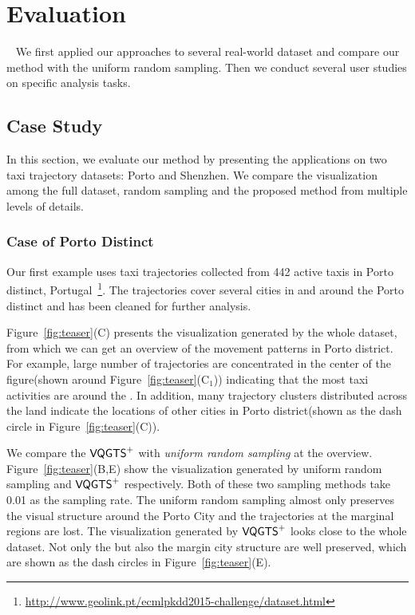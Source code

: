 \section{Evaluation}~\label{sec:exp}
We first applied our approaches to several real-world dataset and compare our method with the uniform random sampling. Then we conduct several user studies on specific analysis tasks. 
\subsection{Case Study}
In this section, we evaluate our method by presenting the applications on two taxi trajectory datasets: Porto and Shenzhen. We compare the visualization among the full dataset, random sampling and the proposed method from multiple levels of details. 
\subsubsection{Case of Porto Distinct}
Our first example uses taxi trajectories collected from 442 active taxis in Porto distinct, Portugal~\footnote{\url{http://www.geolink.pt/ecmlpkdd2015-challenge/dataset.html}}. The trajectories cover several cities in and around the Porto distinct and has been cleaned for further analysis.


Figure~\ref{fig:teaser}(C) presents the visualization generated by the whole dataset, from which we can get an overview of the movement patterns in Porto district. For example, large number of trajectories are concentrated in the center of the figure(shown around Figure~\ref{fig:teaser}(C$_1$)) indicating that the most taxi activities are around the . In addition, 
many trajectory clusters distributed across the land indicate the locations of other cities in Porto district(shown as the dash circle in Figure~\ref{fig:teaser}(C)). 

We compare the $\mathsf{VQGTS}^{+}$ with \textit{uniform random sampling} at the overview. 
Figure~\ref{fig:teaser}(B,E) show the visualization generated by uniform random sampling and $\mathsf{VQGTS}^{+}$ respectively. Both of these two sampling methods take 0.01 as the sampling rate. The uniform random sampling almost only preserves the visual structure around the Porto City and the trajectories at the marginal regions are lost.
The visualization generated by $\mathsf{VQGTS}^{+}$ looks close to the whole dataset. Not only the  but also the margin city structure are well preserved, which are shown as the dash circles in Figure~\ref{fig:teaser}(E).
 
